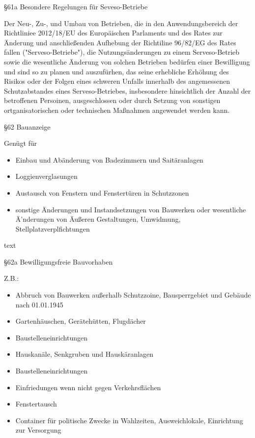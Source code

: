 §61a Besondere Regelungen für Seveso-Betriebe
\begin{tcolorbox}[colback=lightgray!5!lightgray,colframe=lightgray!75!black]
	Der Neu-, Zu-, und Umbau von Betrieben, die in den Anwendungsbereich der Richtliniee 2012/18/EU des Europäischen Parlaments und des Rates zur Änderung und anschließenden Aufhebung der Richtiline 96/82/EG des Rates fallen ("Serveso-Betriebe"), die Nutzungsänderungen zu einem Serveso-Betrieb sowie die wesentliche Änderung von solchen Betrieben bedürfen einer Bewilligung und sind so zu planen und auszufürhen, das seine erhebliche Erhöhung des Risikos oder der Folgen eines schweren Unfalls innerhalb des angemessenen Schutzabstandes eines Serveso-Betriebes, insbesondere hinsichtlich der Anzahl der betroffenen Persoinen, ausgeschlossen oder durch Setzung von sonstigen ortganisatorischen oder technischen Maßnahmen angewendet werden kann.
\end{tcolorbox}

§62 Bauanzeige
\begin{tcolorbox}[colback=lightgray!5!lightgray,colframe=lightgray!75!black]
Genügt für\newline
	\begin{itemize}
		\item Einbau und Abänderung von Badezimmern und Saitäranlagen
		\item Loggienverglasungen
		\item Austausch von Fenstern und Fenstertüren in Schutzzonen
		\item sonstige Änderungen und Instandsetzungen von Bauwerken oder wesentliche Ä'nderungen von Äußeren Gestaltungen, Umwidmung, Stellplatzverplfichtungen
	\end{itemize}
\end{tcolorbox}

\begin{tcolorbox}[colback=lightgray!5!lightgray,colframe=lightgray!75!black]
text
\end{tcolorbox}
§62a Bewilligungsfreie Bauvorhaben
\begin{tcolorbox}[colback=lightgray!5!lightgray,colframe=lightgray!75!black]
Z.B.: \newline
	\begin{itemize}
		\item Abbruch von Bauwerken außerhalb Schutzzoine, Bausperrgebiet und Gebäude nach 01.01.1945
		\item Gartenhäuschen, Gerätehütten, Flugdächer
		\item Baustelleneinrichtungen
		\item Hauskanäle, Senkgruben und Hauskäranlagen
		\item Baustelleneinrichtungen
		\item Einfriedungen wenn nicht gegen Verkehrsflächen
		\item Fenstertausch
		\item Container für politische Zwecke in Wahlzeiten, Ausweichlokale, Einrichtung zur Versorgung
	\end{itemize}
\end{tcolorbox}

